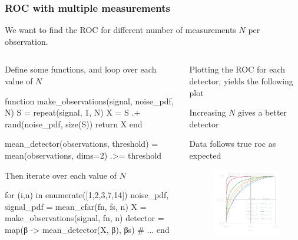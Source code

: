 \documentclass[compress,aspectratio=169]{beamer}
\newcommand\pin{%
\parbox[t]{10pt}{\raisebox{0.2pt}{\usebeamercolor[fg]{mybullet}{$\ast$}}}}
\begin{document}
\begin{frame}[fragile] %
    \frametitle{ROC with multiple measurements}
    We want to find the ROC for different number of measurements $N$ per observation.

    \begin{columns}
        \begin{column}{0.5\textwidth}

            Define some functions, and loop over each value of $N$
            \begin{jllisting}[gobble=16]
                function make_observations(signal, noise_pdf, N)
                    S = repeat(signal, 1, N)
                    X = S .+ rand(noise_pdf, size(S))
                    return X
                end

                mean_detector(observations, threshold) = mean(observations, dims=2) .>= threshold
            \end{jllisting}
            Then iterate over each value of $N$
            \begin{jllisting}[gobble=16]
                for (i,n) in enumerate([1,2,3,7,14])
                    noise_pdf, signal_pdf = mean_cfar(fn, fs, n)
                    X = make_observations(signal, fn, n)
                    detector = map(β -> mean_detector(X, β), βs)
                    # ...
                end
            \end{jllisting}
        \end{column}
        \begin{column}{0.5\textwidth}
            Plotting the ROC for each detector, yields the following plot
            \pin Increasing $N$ gives a better detector

            \pin Data follows true roc as expected
            \begin{figure}
                \includegraphics[width=0.8\columnwidth]{"../g.pdf"}
            \end{figure}
        \end{column}
    \end{columns}
    
\end{frame}
\end{document}
